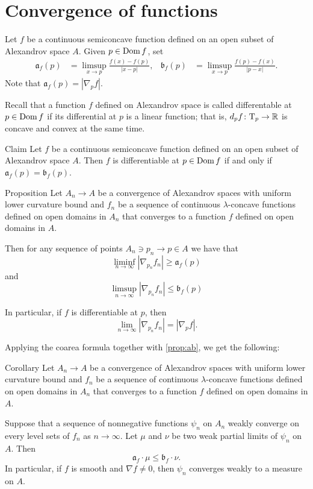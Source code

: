 \section{Convergence of functions}

Let $f$ be a continuous semiconcave function defined on an open subset of Alexandrov space $A$.
Given $p\in \mathop{\rm Dom} f$, set 
\begin{align*}
\mathfrak{a}_f(p)&=\limsup_{x\to p}\frac{f(x)-f(p)}{|x-p|},
&
\mathfrak{b}_f(p)&=\limsup_{x\to p}\frac{f(p)-f(x)}{|p-x|}.
\end{align*}
Note that $\mathfrak{a}_f(p)=|\nabla_pf|$.

Recall that a function $f$ defined on Alexandrov space is called differentable at $p\in \mathop{\rm Dom} f$ if its differential at $p$ is a linear function;
that is, $d_pf\colon\text{\rm T}_p\to\mathbb{R}$ is concave and convex at the same time.

\begin{thm}{Claim} Let $f$ be a continuous semiconcave function defined on an open subset of Alexandrov space $A$.
Then  $f$ is differentiable at $p\in\mathop{\rm Dom} f$ if and only if $\mathfrak{a}_f(p)=\mathfrak{b}_f(p)$.
\end{thm}


\begin{thm}{Proposition}\label{prop:ab}
Let $A_n\to A$ be a convergence of Alexandrov spaces with uniform lower curvature bound
and $f_n$ be a sequence of continuous $\lambda$-concave functions defined on open domains in  $A_n$ that converges to a function $f$ defined on open domains in  $A$.

Then for any sequence of points $A_n\ni p_n\to p\in A$ we have
that 
\[\liminf_{n\to\infty}|\nabla_{p_n}f_n|\ge \mathfrak{a}_{f}(p)\]
and 
\[\limsup_{n\to\infty}|\nabla_{p_n}f_n|\le \mathfrak{b}_{f}(p)\]

In particular, if $f$ is differentiable at $p$, then 
\[\lim_{n\to\infty}|\nabla_{p_n}f_n|= |\nabla_{p}f|.\]
\end{thm}

Applying the coarea formula together with \ref{prop:ab}, we get the following:

\begin{thm}{Corollary}
Let $A_n\to A$ be a convergence of Alexandrov spaces with uniform lower curvature bound
and $f_n$ be a sequence of continuous $\lambda$-concave functions defined on open domains in  $A_n$ that converges to a function $f$ defined on open domains in  $A$.

Suppose that a sequence of nonnegative functions $\psi_n$ on $A_n$ weakly converge on every level sets of $f_n$ as $n\to \infty$. %
Let $\mu$ and $\nu$ be two weak partial limits of $\psi_n$ on $A$.
Then 
\[\mathfrak{a}_f\cdot \mu\le \mathfrak{b}_f\cdot \nu.\]
In particular, if $f$ is smooth and $\nabla f\ne 0$, then 
$\psi_n$ converges weakly to a measure on $A$.
\end{thm}

